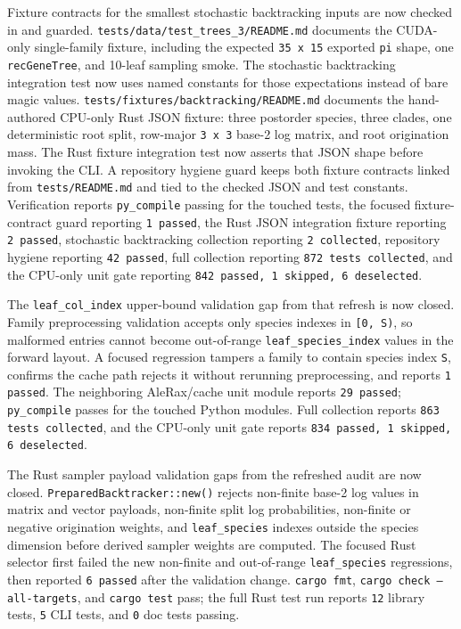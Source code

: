 \documentclass[11pt]{article}
\begin{document}
Fixture contracts for the smallest stochastic backtracking inputs are now
checked in and guarded.  \texttt{tests/data/test\_trees\_3/README.md}
documents the CUDA-only single-family fixture, including the expected
\texttt{35 x 15} exported \texttt{pi} shape, one \texttt{recGeneTree}, and
10-leaf sampling smoke.  The stochastic backtracking integration test now uses
named constants for those expectations instead of bare magic values.
\texttt{tests/fixtures/backtracking/README.md} documents the hand-authored
CPU-only Rust JSON fixture: three postorder species, three clades, one
deterministic root split, row-major \texttt{3 x 3} base-2 log matrix, and root
origination mass.  The Rust fixture integration test now asserts that JSON
shape before invoking the CLI.  A repository hygiene guard keeps both fixture
contracts linked from \texttt{tests/README.md} and tied to the checked JSON and
test constants.  Verification reports \texttt{py\_compile} passing for the
touched tests, the focused fixture-contract guard reporting \texttt{1 passed},
the Rust JSON integration fixture reporting \texttt{2 passed}, stochastic
backtracking collection reporting \texttt{2 collected}, repository hygiene
reporting \texttt{42 passed}, full collection reporting
\texttt{872 tests collected}, and the CPU-only unit gate reporting
\texttt{842 passed, 1 skipped, 6 deselected}.

The \texttt{leaf\_col\_index} upper-bound validation gap from that refresh is
now closed.  Family preprocessing validation accepts only species indexes in
\texttt{[0, S)}, so malformed entries cannot become out-of-range
\texttt{leaf\_species\_index} values in the forward layout.  A focused
regression tampers a family to contain species index \texttt{S}, confirms
the cache path rejects it without rerunning preprocessing, and reports
\texttt{1 passed}.  The neighboring AleRax/cache unit module reports
\texttt{29 passed}; \texttt{py\_compile} passes for the touched Python modules.
Full collection reports \texttt{863 tests collected}, and the CPU-only unit
gate reports \texttt{834 passed, 1 skipped, 6 deselected}.

The Rust sampler payload validation gaps from the refreshed audit are now
closed.  \texttt{PreparedBacktracker::new()} rejects non-finite base-2 log
values in matrix and vector payloads, non-finite split log probabilities,
non-finite or negative origination weights, and \texttt{leaf\_species} indexes
outside the species dimension before derived sampler weights are computed.  The
focused Rust selector first failed the new non-finite and out-of-range
\texttt{leaf\_species} regressions, then reported \texttt{6 passed} after the
validation change.  \texttt{cargo fmt}, \texttt{cargo check --all-targets}, and
\texttt{cargo test} pass; the full Rust test run reports \texttt{12} library
tests, \texttt{5} CLI tests, and \texttt{0} doc tests passing.
\end{document}
